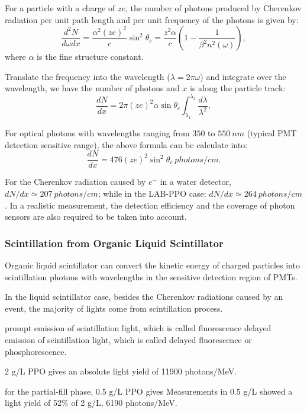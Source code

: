 For a particle with a charge of $ze$, the number of photons produced by Cherenkov radiation per unit path length and per unit frequency of the photons is given by\cite{leo2012techniques}:
\[
\frac{d^2N}{d\omega dx}=\frac{\alpha^2 (ze)^2}{c}\sin^2\theta_c=\frac{z^2\alpha}{c}(1-\frac{1}{\beta^2 n^2(\omega)}),
\]
where $\alpha$ is the fine structure constant.

Translate the frequency into the wavelength ($\lambda=2\pi\omega$) and integrate over the wavelength, we have the number of photons and $x$ is along the particle track\cite{leo2012techniques}:
\[
\frac{dN}{dx}=2\pi (ze)^2\alpha\sin\theta_c\int_{\lambda_1}^{\lambda_2}\frac{d\lambda}{\lambda^2},
\]

For optical photons with wavelengths ranging from $350$ to $550~nm$ (typical PMT detection sensitive range), the above formula can be calculate into\cite{leo2012techniques}:
\[
\frac{dN}{dx}=476(ze)^2\sin^2\theta_c~photons/cm.
\]

For the Cherenkov radiation caused by $e^-$ in a water detector, $dN/dx \simeq 207~photons/cm$; while in the LAB-PPO case: $dN/dx \simeq 264~photons/cm$. In a realistic measurement, the detection efficiency and the coverage of photon sensors are also required to be taken into account.

\subsubsection{Scintillation from Organic Liquid Scintillator}

Organic liquid scintillator can convert the kinetic energy of charged particles into scintillation photons with wavelengths in the sensitive detection region of PMTs.  


In the liquid scintillator case, besides the Cherenkov radiations caused by an event, the majority of lights come from scintillation process.



prompt emission of scintillation light, which is called fluorescence
delayed emission of scintillation light, which is called delayed fluorescence or phosphorescence.

\cite{knoll2010radiation}

2 g/L PPO gives an absolute light yield of 11900 photons/MeV.


for the partial-fill phase, 0.5 g/L PPO gives Measurements in 0.5 g/L showed a light yield of 52\% of 2 g/L,  
6190 photons/MeV\cite{tanner0p5,joshW1}.


